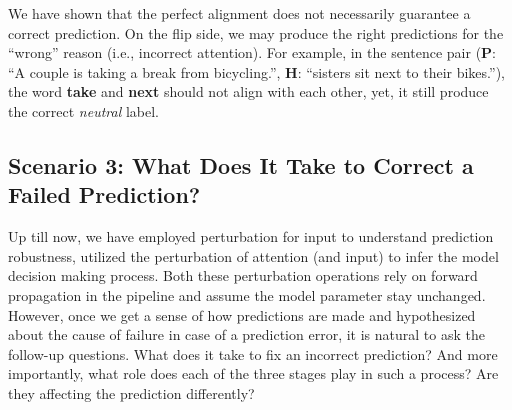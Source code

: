 

We have shown that the perfect alignment does not necessarily guarantee a correct prediction.
%
On the flip side, we may produce the right predictions for the ``wrong'' reason (i.e., incorrect attention). 
For example, in the sentence pair (\textbf{P}: ``A couple is taking a break from bicycling.'', \textbf{H}: ``sisters sit next to their bikes.''), the word \textbf{take} and \textbf{next} should not align with each other,
yet, it still produce the correct \emph{neutral} label.%







\subsection{Scenario 3: What Does It Take to Correct a Failed Prediction?}
Up till now, we have employed perturbation for input to understand prediction robustness, utilized the perturbation of attention (and input) to infer the model decision making process. Both these perturbation operations rely on forward propagation in the pipeline and assume the model parameter stay unchanged.
%
However, once we get a sense of how predictions are made and hypothesized about the cause of failure in case of a prediction error, it is natural to ask the follow-up questions. What does it take to fix an incorrect prediction? And more importantly, what role does each of the three stages play in such a process? Are they affecting the prediction differently?

